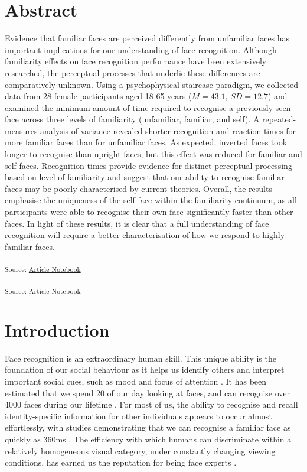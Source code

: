 \documentclass[
  10pt,
  letterpaper,
]{article}
\begin{document}
\section*{Abstract}
Evidence that familiar faces are perceived differently from unfamiliar
faces has important implications for our understanding of face
recognition. Although familiarity effects on face recognition
performance have been extensively researched, the perceptual processes
that underlie these differences are comparatively unknown. Using a
psychophysical staircase paradigm, we collected data from 28 female
participants aged 18-65 years (\(M = 43.1\), \(SD = 12.7\)) and examined
the minimum amount of time required to recognise a previously seen face
across three levels of familiarity (unfamiliar, familiar, and self). A
repeated-measures analysis of variance revealed shorter recognition and
reaction times for more familiar faces than for unfamiliar faces. As
expected, inverted faces took longer to recognise than upright faces,
but this effect was reduced for familiar and self-faces. Recognition
times provide evidence for distinct perceptual processing based on level
of familiarity and suggest that our ability to recognise familiar faces
may be poorly characterised by current theories. Overall, the results
emphasise the uniqueness of the self-face within the familiarity
continuum, as all participants were able to recognise their own face
significantly faster than other faces. In light of these results, it is
clear that a full understanding of face recognition will require a
better characterisation of how we respond to highly familiar faces.


\linenumbers
\textsubscript{Source:
\href{https://deborahapthorp.github.io/SelfFaceManuscript/index-preview.html}{Article
Notebook}}

\textsubscript{Source:
\href{https://deborahapthorp.github.io/SelfFaceManuscript/index-preview.html}{Article
Notebook}}

\section{Introduction}\label{introduction}

Face recognition is an extraordinary human skill. This unique ability is
the foundation of our social behaviour as it helps us identify others
and interpret important social cues, such as mood and focus of attention
\citep{burton2015a, mohr2018a}. It has been estimated that we spend
20\(%
\) of our day looking at faces, and can recognise over 4000 faces during
our lifetime \citep{jenkins2018a, oruc2019a}. For most of us, the
ability to recognise and recall identity-specific information for other
individuals appears to occur almost effortlessly, with studies
demonstrating that we can recognise a familiar face as quickly as 360ms
\citep{besson2016a, blauch2021a, oruc2019a, ramon2016a}. The efficiency
with which humans can discriminate within a relatively homogeneous
visual category, under constantly changing viewing conditions, has
earned us the reputation for being face experts
\citep{collins2018a, dobs2019a, kramer2017a, quek2021a}.
\end{document}
